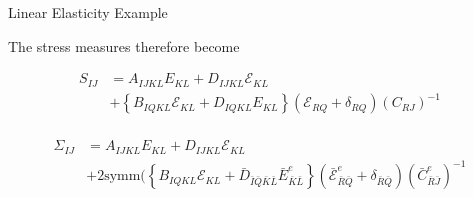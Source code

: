 \documentclass[11pt]{beamer}
\begin{document}
\begin{frame}{Linear Elasticity Example}

The stress measures therefore become

\begin{align*}
S_{IJ} &= A_{IJKL} E_{KL}+ D_{IJKL}\mathcal{E}_{KL}\\
& + \left\{ B_{IQKL} \mathcal{E}_{KL} + D_{IQKL}E_{KL} \right\}\left(\mathcal{E}_{RQ} + \delta_{RQ}\right)\left(C_{RJ}\right)^{-1}\\
\end{align*}

\begin{align*}
\Sigma_{IJ}&=A_{IJKL} E_{KL} + D_{IJKL}\mathcal{E}_{KL}\\
& + 2\text{symm}\bigg( \left\{ B_{IQKL} \mathcal{E}_{KL} + \bar{D}_{\bar{I}\bar{Q}\bar{K}\bar{L}}\bar{E}_{\bar{K}\bar{L}}^e  \right\}\left(\bar{\mathcal{E}}_{\bar{R}\bar{Q}}^e + \delta_{\bar{R}\bar{Q}}\right) \left(\bar{C}_{\bar{R}\bar{J}}^e\right)^{-1}\\
\end{align*}

\end{frame}
\end{document}
